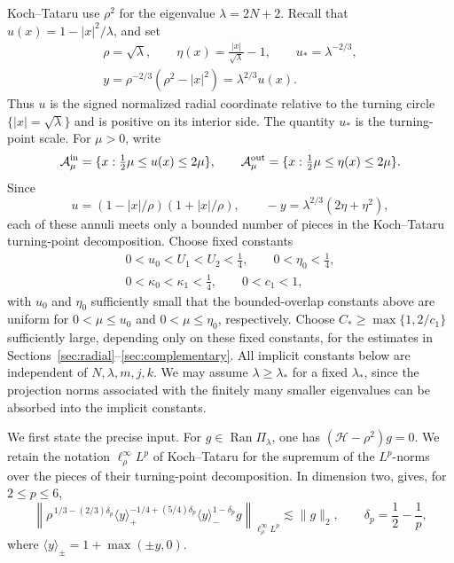 \documentclass[11pt,a4paper]{amsart}
\numberwithin{equation}{section}
\newcommand{\norm}[1]{\lVert #1\rVert}
\begin{document}
Koch--Tataru use \(\rho^2\) for the eigenvalue \(\lambda=2N+2\). Recall that
\(u(x)=1-|x|^2/\lambda\), and set
\[
 \begin{gathered}
  \rho=\sqrt\lambda,\qquad
  \eta(x)=\frac{|x|}{\sqrt\lambda}-1,
  \qquad u_*=\lambda^{-2/3},\\
  y=\rho^{-2/3}(\rho^2-|x|^2)=\lambda^{2/3}u(x).
 \end{gathered}
\]
Thus \(u\) is the signed normalized radial coordinate relative to the turning
circle \(\{|x|=\sqrt\lambda\}\) and is positive on its interior side.
The quantity \(u_*\) is the turning-point scale. For \(\mu>0\), write
\[
 \mathcal A_\mu^{\rm in}=\{x:\tfrac12\mu\le u(x)\le2\mu\},
 \qquad
 \mathcal A_\mu^{\rm out}=\{x:\tfrac12\mu\le\eta(x)\le2\mu\}.
\]
Since
\[
 u=(1-|x|/\rho)(1+|x|/\rho),
 \qquad -y=\lambda^{2/3}(2\eta+\eta^2),
\]
each of these annuli meets only a bounded number of pieces in the
Koch--Tataru turning-point decomposition.
Choose fixed constants
\begin{equation}\label{eq:lg-constant-hierarchy}
 \begin{gathered}
  0<u_0<U_1<U_2<\frac14,\qquad 0<\eta_0<\frac14,\\
  0<\kappa_0<\kappa_1<\frac14,\qquad 0<c_1<1,
 \end{gathered}
\end{equation}
with \(u_0\) and \(\eta_0\) sufficiently small that the bounded-overlap
constants above are uniform for \(0<\mu\le u_0\) and
\(0<\mu\le\eta_0\), respectively. Choose
\(C_*\ge\max\{1,2/c_1\}\) sufficiently large, depending only on these fixed
constants, for the estimates in Sections~\ref{sec:radial}--\ref{sec:complementary}.
All implicit constants below are independent of \(N,\lambda,m,j,k\). We may
assume \(\lambda\ge\lambda_*\) for a fixed \(\lambda_*\), since the projection
norms associated with the finitely many smaller eigenvalues can be absorbed
into the implicit constants.

We first state the precise input. For
\(g\in\operatorname{Ran}\Pi_\lambda\), one has
\((\mathcal H-\rho^2)g=0\). We retain the notation
\(\ell^\infty_\rho L^p\) of Koch--Tataru for the supremum of the
\(L^p\)-norms over the pieces of their turning-point decomposition. In
dimension two, \cite[Theorem~3(a)]{KochTataru} gives, for \(2\le p\le6\),
\begin{equation}\label{eq:KT-weighted}
 \left\|
 \rho^{\,1/3-(2/3)\delta_p}
 \langle y\rangle_+^{-1/4+(5/4)\delta_p}
 \langle y\rangle_-^{1-\delta_p}g
 \right\|_{\ell^\infty_\rho L^p}
 \lesssim\norm g_2,
 \qquad
 \delta_p=\frac12-\frac1p,
\end{equation}
where \(\langle y\rangle_\pm=1+\max(\pm y,0)\).
\end{document}

